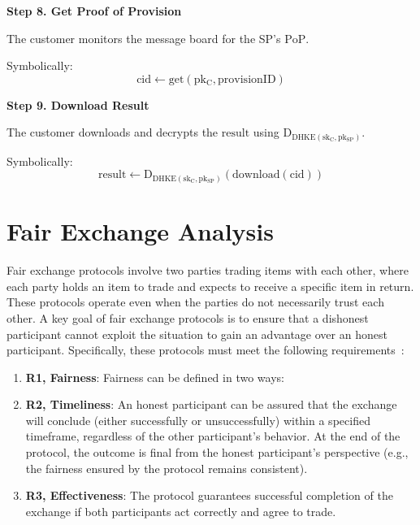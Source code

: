 \documentclass[pdftex,twocolumn,epjc3]{svjour3}
\begin{document}
\noindent \textbf{Step 8. Get Proof of Provision}\label{step-8-get-proof-of-provision}

The customer monitors the message board for the SP's $\mathrm{PoP}$.

Symbolically: 
\[
\mathrm{cid \gets get(pk_C, provisionID)}
\]

\noindent \textbf{Step 9. Download Result}\label{step-9-download-result}

The customer downloads and decrypts the $\mathrm{result}$ using $\mathrm{D_{DHKE(sk_C, pk_{SP})}}$.

Symbolically: 
\[
\mathrm{result \gets D_{DHKE(sk_C, pk_{SP})}(download(cid))}
\]

\section{Fair Exchange Analysis}\label{sec:fairness-analysis}

Fair exchange protocols involve two parties trading items with each other, where each party holds an item to trade and expects to receive a specific item in return. These protocols operate even when the parties do not necessarily trust each other. A key goal of fair exchange protocols is to ensure that a dishonest participant cannot exploit the situation to gain an advantage over an honest participant. Specifically, these protocols must meet the following requirements~\cite{asokanFairnessElectronicCommerce1998, liuFairnessCryptocurrencyPayments2018}:
\begin{enumerate}

    \item \textbf{R1, Fairness}: Fairness can be defined in two ways:


    \item \textbf{R2, Timeliness}: An honest participant can be assured that the exchange will conclude (either successfully or unsuccessfully) within a specified timeframe, regardless of the other participant's behavior. At the end of the protocol, the outcome is final from the honest participant's perspective (e.g., the fairness ensured by the protocol remains consistent).
    
    \item \textbf{R3, Effectiveness}: The protocol guarantees successful completion of the exchange if both participants act correctly and agree to trade.

\end{enumerate}    
\end{document}
